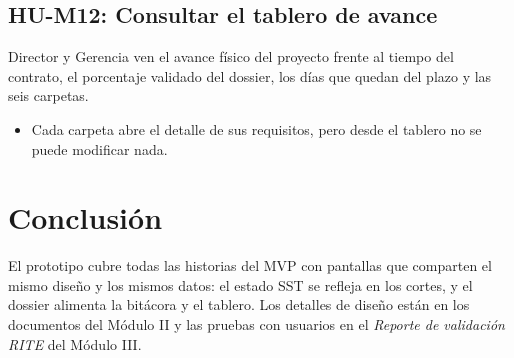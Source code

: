\documentclass[11pt]{article}
\begin{document}
\subsection*{HU-M12: Consultar el tablero de avance}
Director y Gerencia ven el avance físico del proyecto frente al tiempo del contrato, el porcentaje validado del dossier, los días que quedan del plazo y las seis carpetas.
\begin{itemize}
  \item Cada carpeta abre el detalle de sus requisitos, pero desde el tablero no se puede modificar nada.
\end{itemize}

\section{Conclusión}

El prototipo cubre todas las historias del MVP con pantallas que comparten el mismo diseño y los mismos datos: el estado SST se refleja en los cortes, y el dossier alimenta la bitácora y el tablero. Los detalles de diseño están en los documentos del Módulo II y las pruebas con usuarios en el \emph{Reporte de validación RITE} del Módulo III.
\end{document}

